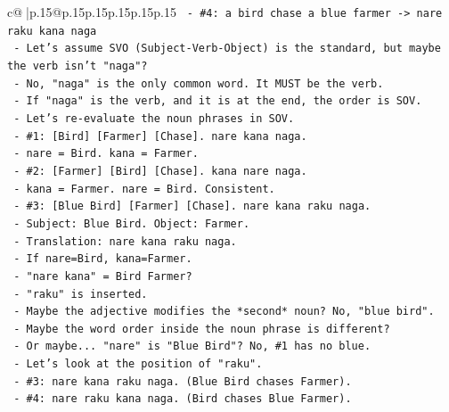 \documentclass{article}
\begin{document}
{\begin{supertabular}{c@{$\;$}|p{.15\linewidth}@{}p{.15\linewidth}p{.15\linewidth}p{.15\linewidth}p{.15\linewidth}p{.15\linewidth}}
{{{\texttt{                   {-} \#4: a bird chase a blue farmer {-}> nare raku kana naga} \\
\texttt{                   {-} Let's assume SVO (Subject{-}Verb{-}Object) is the standard, but maybe the verb isn't "naga"?} \\
\texttt{                   {-} No, "naga" is the only common word. It MUST be the verb.} \\
\texttt{                   {-} If "naga" is the verb, and it is at the end, the order is SOV.} \\
\texttt{                   {-} Let's re{-}evaluate the noun phrases in SOV.} \\
\texttt{                   {-} \#1: {[}Bird{]} {[}Farmer{]} {[}Chase{]}. nare kana naga.} \\
\texttt{                     {-} nare = Bird. kana = Farmer.} \\
\texttt{                   {-} \#2: {[}Farmer{]} {[}Bird{]} {[}Chase{]}. kana nare naga.} \\
\texttt{                     {-} kana = Farmer. nare = Bird. Consistent.} \\
\texttt{                   {-} \#3: {[}Blue Bird{]} {[}Farmer{]} {[}Chase{]}. nare kana raku naga.} \\
\texttt{                     {-} Subject: Blue Bird. Object: Farmer.} \\
\texttt{                     {-} Translation: nare kana raku naga.} \\
\texttt{                     {-} If nare=Bird, kana=Farmer.} \\
\texttt{                     {-} "nare kana" = Bird Farmer?} \\
\texttt{                     {-} "raku" is inserted.} \\
\texttt{                     {-} Maybe the adjective modifies the *second* noun? No, "blue bird".} \\
\texttt{                     {-} Maybe the word order inside the noun phrase is different?} \\
\texttt{                     {-} Or maybe... "nare" is "Blue Bird"? No, \#1 has no blue.} \\
\texttt{                     {-} Let's look at the position of "raku".} \\
\texttt{                     {-} \#3: nare kana raku naga. (Blue Bird chases Farmer).} \\
\texttt{                     {-} \#4: nare raku kana naga. (Bird chases Blue Farmer).} \\
}}}
\end{supertabular}}
\end{document}
